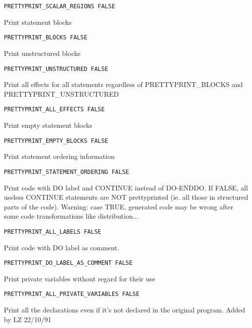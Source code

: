 \begin{verbatim}
PRETTYPRINT_SCALAR_REGIONS FALSE
\end{verbatim}

Print statement blocks

\begin{verbatim}
PRETTYPRINT_BLOCKS FALSE
\end{verbatim}

Print unstructured blocks

\begin{verbatim}
PRETTYPRINT_UNSTRUCTURED FALSE
\end{verbatim}

Print all effects for all statements regardless of PRETTYPRINT\_BLOCKS
and PRETTYPRINT\_UNSTRUCTURED

\begin{verbatim}
PRETTYPRINT_ALL_EFFECTS FALSE
\end{verbatim}

Print empty statement blocks

\begin{verbatim}
PRETTYPRINT_EMPTY_BLOCKS FALSE
\end{verbatim}

Print statement ordering information

\begin{verbatim}
PRETTYPRINT_STATEMENT_ORDERING FALSE
\end{verbatim}

Print code with DO label and CONTINUE instead of DO-ENDDO. If FALSE, all
useless CONTINUE statements are NOT prettyprinted (ie. all those in
structured parts of the code). Warning: case TRUE, generated code may be
wrong after some code transformations like distribution...

\begin{verbatim}
PRETTYPRINT_ALL_LABELS FALSE
\end{verbatim}

Print code with DO label as comment.

\begin{verbatim}
PRETTYPRINT_DO_LABEL_AS_COMMENT FALSE
\end{verbatim}

Print private variables without regard for their use

\begin{verbatim}
PRETTYPRINT_ALL_PRIVATE_VARIABLES FALSE
\end{verbatim}


Print all the declarations even if it's not declared in the original program.
Added by LZ 22/10/91

